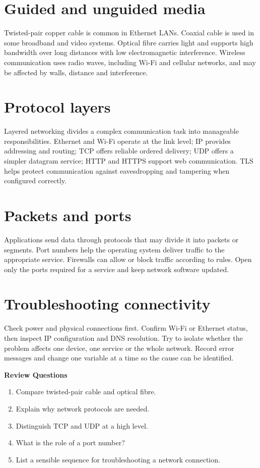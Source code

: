\documentclass[11pt,openany,oneside]{book}
\newcommand{\reviewtitle}{\par\noindent\textbf{\color{Navy}Review Questions}\par}
\begin{document}
\section{Guided and unguided media}
Twisted-pair copper cable is common in Ethernet LANs. Coaxial cable is used in some broadband and video systems. Optical fibre carries light and supports high bandwidth over long distances with low electromagnetic interference. Wireless communication uses radio waves, including Wi-Fi and cellular networks, and may be affected by walls, distance and interference.

\section{Protocol layers}
Layered networking divides a complex communication task into manageable responsibilities. Ethernet and Wi-Fi operate at the link level; IP provides addressing and routing; TCP offers reliable ordered delivery; UDP offers a simpler datagram service; HTTP and HTTPS support web communication. TLS helps protect communication against eavesdropping and tampering when configured correctly.

\section{Packets and ports}
Applications send data through protocols that may divide it into packets or segments. Port numbers help the operating system deliver traffic to the appropriate service. Firewalls can allow or block traffic according to rules. Open only the ports required for a service and keep network software updated.

\section{Troubleshooting connectivity}
Check power and physical connections first. Confirm Wi-Fi or Ethernet status, then inspect IP configuration and DNS resolution. Try to isolate whether the problem affects one device, one service or the whole network. Record error messages and change one variable at a time so the cause can be identified.

\reviewtitle
\begin{enumerate}
\item Compare twisted-pair cable and optical fibre.
\item Explain why network protocols are needed.
\item Distinguish TCP and UDP at a high level.
\item What is the role of a port number?
\item List a sensible sequence for troubleshooting a network connection.
\end{enumerate}
\end{document}
